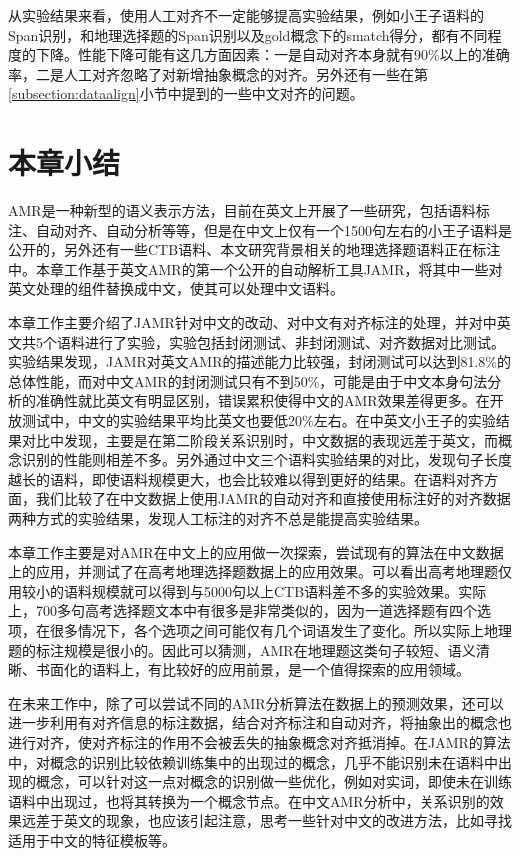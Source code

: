 \documentclass[master, winfont]{njuthesis}
\begin{document}
从实验结果来看，使用人工对齐不一定能够提高实验结果，例如小王子语料的Span识别，和地理选择题的Span识别以及gold概念下的smatch得分，都有不同程度的下降。性能下降可能有这几方面因素：一是自动对齐本身就有90\%以上的准确率，二是人工对齐忽略了对新增抽象概念的对齐。另外还有一些在第\ref{subsection:dataalign}小节中提到的一些中文对齐的问题。

\section{本章小结}
AMR是一种新型的语义表示方法，目前在英文上开展了一些研究，包括语料标注、自动对齐、自动分析等等，但是在中文上仅有一个1500句左右的小王子语料是公开的，另外还有一些CTB语料、本文研究背景相关的地理选择题语料正在标注中。本章工作基于英文AMR的第一个公开的自动解析工具JAMR，将其中一些对英文处理的组件替换成中文，使其可以处理中文语料。

本章工作主要介绍了JAMR针对中文的改动、对中文有对齐标注的处理，并对中英文共5个语料进行了实验，实验包括封闭测试、非封闭测试、对齐数据对比测试。实验结果发现，JAMR对英文AMR的描述能力比较强，封闭测试可以达到81.8\%的总体性能，而对中文AMR的封闭测试只有不到50\%，可能是由于中文本身句法分析的准确性就比英文有明显区别，错误累积使得中文的AMR效果差得更多。在开放测试中，中文的实验结果平均比英文也要低20\%左右。在中英文小王子的实验结果对比中发现，主要是在第二阶段关系识别时，中文数据的表现远差于英文，而概念识别的性能则相差不多。另外通过中文三个语料实验结果的对比，发现句子长度越长的语料，即使语料规模更大，也会比较难以得到更好的结果。在语料对齐方面，我们比较了在中文数据上使用JAMR的自动对齐和直接使用标注好的对齐数据两种方式的实验结果，发现人工标注的对齐不总是能提高实验结果。

本章工作主要是对AMR在中文上的应用做一次探索，尝试现有的算法在中文数据上的应用，并测试了在高考地理选择题数据上的应用效果。可以看出高考地理题仅用较小的语料规模就可以得到与5000句以上CTB语料差不多的实验效果。实际上，700多句高考选择题文本中有很多是非常类似的，因为一道选择题有四个选项，在很多情况下，各个选项之间可能仅有几个词语发生了变化。所以实际上地理题的标注规模是很小的。因此可以猜测，AMR在地理题这类句子较短、语义清晰、书面化的语料上，有比较好的应用前景，是一个值得探索的应用领域。

在未来工作中，除了可以尝试不同的AMR分析算法在数据上的预测效果，还可以进一步利用有对齐信息的标注数据，结合对齐标注和自动对齐，将抽象出的概念也进行对齐，使对齐标注的作用不会被丢失的抽象概念对齐抵消掉。在JAMR的算法中，对概念的识别比较依赖训练集中的出现过的概念，几乎不能识别未在语料中出现的概念，可以针对这一点对概念的识别做一些优化，例如对实词，即使未在训练语料中出现过，也将其转换为一个概念节点。在中文AMR分析中，关系识别的效果远差于英文的现象，也应该引起注意，思考一些针对中文的改进方法，比如寻找适用于中文的特征模板等。
\end{document}
